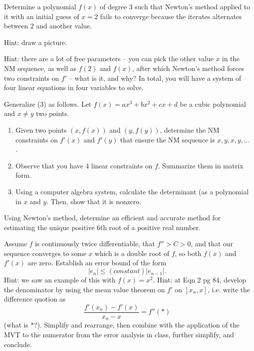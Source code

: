 \documentclass{article}
\begin{document}
\begin{problem}
    Determine a polynomial \(f(x)\) of degree \(3\) such that Newton's method applied to it with an initial guess of \(x=2\) fails to converge because the iterates alternates between \(2\) and another value.
    
    Hint: draw a picture.
    
    Hint: there are a lot of free parameters -- you can pick the other value \(x\) in the NM sequence, as well as \(f(2)\) and \(f(x)\), after which Newton's method forces two constraints on \(f'\) -- what is it, and why? In total, you will have a system of four linear equations in four variables to solve.
\end{problem}

\begin{problem}
    Generalize (3) as follows. Let \(f(x) = ax^3 + bx^2 + cx +d\) be a cubic polynomial and \(x\neq y\) two points.
    \begin{enumerate}
        \item Given two points \((x,f(x))\) and \((y,f(y))\), determine the NM constraints on \(f'(x)\) and \(f'(y)\) that ensure the NM sequence is \(x,y,x,y,...\).
        \item Observe that you have \(4\) linear constraints on \(f\). Summarize them in matrix form.
        \item Using a computer algebra system, calculate the determinant (as a polynomial in \(x\) and \(y\). Then, show that it is nonzero.
    \end{enumerate}
\end{problem}

\begin{problem}
    Using Newton's method, determine an efficient and accurate method for estimating the unique positive \(6\)th root of a positive real number.
\end{problem}

\begin{problem}
     Assume \(f\) is continuously twice differentiable, that \(f'' >C>0\), and that our sequence converges to some \(x\) which is a double root of \(f\), so both \(f(x)\) and \(f'(x)\) are zero. Establish an error bound of the form
    \[|e_n| \leq (constant) |e_{n-1}|.\]
    Hint: we saw an example of this with \(f(x) = x^2\). Hint: at Eqn 2 pg 84, develop the denominator by using the mean value theorem on \(f'\) on \([x_n,x]\), i.e. write the difference quotion as
    \[\frac{f'(x_n) - f'(x)}{x_n-x} = f''(*)\]
    (what is \(*\)?). Simplify and rearrange, then combine with the application of the MVT to the numerator from the error analysis in class, further simplify, and conclude.
\end{problem}
\end{document}
